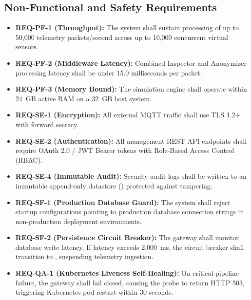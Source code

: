 \documentclass[a4paper]{article}
\begin{document}
\subsection{Non-Functional and Safety Requirements}
\begin{itemize}
    \item \textbf{REQ-PF-1 (Throughput):} The system shall sustain processing of up to 50,000 telemetry packets/second across up to 10,000 concurrent virtual sensors.
    \item \textbf{REQ-PF-2 (Middleware Latency):} Combined Inspector and Anonymizer processing latency shall be under 15.0 milliseconds per packet.
    \item \textbf{REQ-PF-3 (Memory Bound):} The simulation engine shall operate within 24~GB active RAM on a 32~GB host system.
    \item \textbf{REQ-SE-1 (Encryption):} All external MQTT traffic shall use TLS 1.2+ with forward secrecy.
    \item \textbf{REQ-SE-2 (Authentication):} All management REST API endpoints shall require OAuth 2.0 / JWT Bearer tokens with Role-Based Access Control (RBAC).
    \item \textbf{REQ-SE-4 (Immutable Audit):} Security audit logs shall be written to an immutable append-only datastore () protected against tampering.
    \item \textbf{REQ-SF-1 (Production Database Guard):} The system shall reject startup configurations pointing to production database connection strings in non-production deployment environments.
    \item \textbf{REQ-SF-2 (Persistence Circuit Breaker):} The gateway shall monitor database write latency. If latency exceeds 2,000~ms, the circuit breaker shall transition to , suspending telemetry ingestion.
    \item \textbf{REQ-QA-1 (Kubernetes Liveness Self-Healing):} On critical pipeline failure, the gateway shall fail closed, causing the  probe to return HTTP 503, triggering Kubernetes pod restart within 30 seconds.
\end{itemize}
\end{document}
